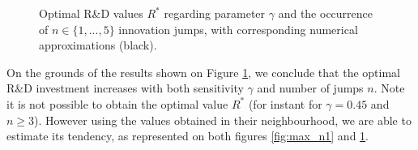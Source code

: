 \begin{figure}[!htb]
	\begin{subfigmatrix}{2}
	\end{subfigmatrix}
	\caption{Optimal R\&D values $R^*$ regarding parameter $\gamma$ and the occurrence of $n\in \{1,...,5\}$ innovation jumps, with corresponding numerical approximations (black). }
	\label{fig:max_nR}
\end{figure}

On the grounds of the results shown on Figure \ref{fig:max_nR}, we conclude that the optimal R\&D investment increases with both sensitivity $\gamma$ and number of jumps $n$. Note it is not possible to obtain the optimal value $R^*$ (for instant for $\gamma=0.45$ and $n\geq 3$). However using the values obtained in their neighbourhood, we are able to estimate its tendency, as represented on both figures \ref{fig:max_n1} and \ref{fig:max_nR}.

